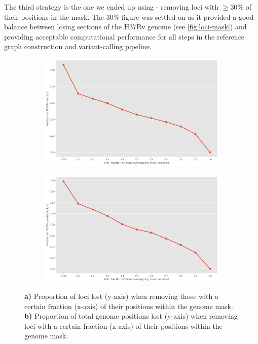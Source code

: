 The third strategy is the one we ended up using - removing loci with $\ge 30\%$ of their positions in the mask. The 30\% figure was settled on as it provided a good balance between losing sections of the H37Rv genome (see \autoref{fig:loci-mask}) and providing acceptable computational performance for all steps in the reference graph construction and \pandora{} variant-calling pipeline.

\begin{figure}
     \centering
     \begin{subfigure}[b]{0.475\textwidth}
         \centering
         \includegraphics[width=\textwidth]{Appendix1/Figs/loci-lost.png}
         \caption{}
         \label{fig:loci-lost}
     \end{subfigure}
     \hfill
     \begin{subfigure}[b]{0.475\textwidth}
         \centering
         \includegraphics[width=\textwidth]{Appendix1/Figs/pos-lost.png}
         \caption{}
         \label{fig:pos-lost}
     \end{subfigure}
        \caption{\textbf{a)} Proportion of loci lost (y-axis) when removing those with a certain fraction (x-axis) of their positions within the genome mask. \textbf{b)} Proportion of total genome positions lost (y-axis) when removing loci with a certain fraction (x-axis) of their positions within the genome mask.}
        \label{fig:loci-mask}
\end{figure}

